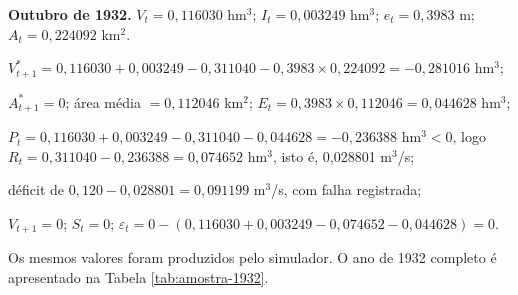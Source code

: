 \textbf{Outubro de 1932.} $V_t = 0{,}116030$ hm$^3$; $I_t = 0{,}003249$ hm$^3$; $e_t = 0{,}3983$ m; $A_t = 0{,}224092$ km$^2$.
\begin{alineas}
    \item $V^{*}_{t+1} = 0{,}116030 + 0{,}003249 - 0{,}311040 - 0{,}3983 \times 0{,}224092 = -0{,}281016$ hm$^3$;
    \item $A^{*}_{t+1} = 0$; área média $= 0{,}112046$ km$^2$; $E_t = 0{,}3983 \times 0{,}112046 = 0{,}044628$ hm$^3$;
    \item $P_t = 0{,}116030 + 0{,}003249 - 0{,}311040 - 0{,}044628 = -0{,}236388$ hm$^3 < 0$, logo $R_t = 0{,}311040 - 0{,}236388 = 0{,}074652$ hm$^3$, isto é, 0,028801 m$^3$/s;
    \item déficit de $0{,}120 - 0{,}028801 = 0{,}091199$ m$^3$/s, com falha registrada;
    \item $V_{t+1} = 0$; $S_t = 0$; $\varepsilon_t = 0 - (0{,}116030 + 0{,}003249 - 0{,}074652 - 0{,}044628) = 0$.
\end{alineas}

Os mesmos valores foram produzidos pelo simulador. O ano de 1932 completo é apresentado na Tabela \ref{tab:amostra-1932}.

